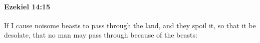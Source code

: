 
		\paragraph{Ezekiel 14:15} %
			\label{EZEKIEL-14-15}

			If I cause noisome beasts to pass through the land, and they spoil it, so that it be desolate, that no man may pass through because of the beasts:


